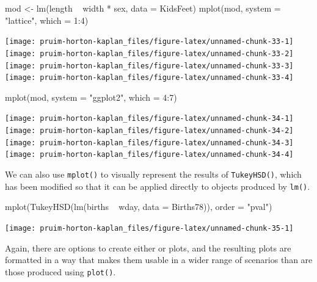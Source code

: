\begin{Schunk}
\begin{Sinput}
mod <- lm(length ~ width * sex, data = KidsFeet)
mplot(mod, system = "lattice", which = 1:4)
\end{Sinput}


\begin{center}\texttt{[image: pruim-horton-kaplan\_files/figure-latex/unnamed-chunk-33-1]} \texttt{[image: pruim-horton-kaplan\_files/figure-latex/unnamed-chunk-33-2]} \texttt{[image: pruim-horton-kaplan\_files/figure-latex/unnamed-chunk-33-3]} \texttt{[image: pruim-horton-kaplan\_files/figure-latex/unnamed-chunk-33-4]} \end{center}

\end{Schunk}\begin{Schunk}
\begin{Sinput}
mplot(mod, system = "ggplot2", which = 4:7)
\end{Sinput}


\begin{center}\texttt{[image: pruim-horton-kaplan\_files/figure-latex/unnamed-chunk-34-1]} \texttt{[image: pruim-horton-kaplan\_files/figure-latex/unnamed-chunk-34-2]} \texttt{[image: pruim-horton-kaplan\_files/figure-latex/unnamed-chunk-34-3]} \texttt{[image: pruim-horton-kaplan\_files/figure-latex/unnamed-chunk-34-4]} \end{center}

\end{Schunk}

We can also use \texttt{mplot()} to visually represent the results of
\texttt{TukeyHSD()}, which has been modified so that it can be applied
directly to objects produced by \texttt{lm()}.

\begin{Schunk}
\begin{Sinput}
mplot(TukeyHSD(lm(births ~ wday, data = Births78)), order = "pval")
\end{Sinput}


\begin{center}\texttt{[image: pruim-horton-kaplan\_files/figure-latex/unnamed-chunk-35-1]} \end{center}

\end{Schunk}

\noindent
Again, there are options to create either  or 
plots, and the resulting plots are formatted in a way that makes them
usable in a wider range of scenarios than are those produced using
\texttt{plot()}.

